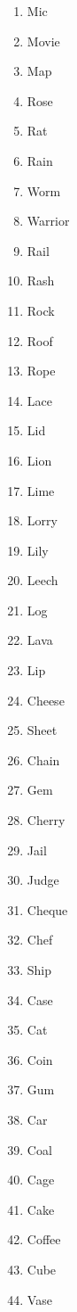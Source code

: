 \begin{enumerate}
       \item  Mic
       \item  Movie
       \item  Map
       \item  Rose
       \item  Rat
       \item  Rain
       \item  Worm
       \item  Warrior
       \item  Rail
       \item  Rash
       \item  Rock
       \item  Roof
       \item  Rope
       \item  Lace
       \item  Lid
       \item  Lion
       \item  Lime
       \item  Lorry
       \item  Lily
       \item  Leech
       \item  Log
       \item  Lava
       \item  Lip
       \item  Cheese
       \item  Sheet
       \item  Chain
       \item  Gem
       \item  Cherry
       \item  Jail
       \item  Judge
       \item  Cheque
       \item  Chef
       \item  Ship
       \item  Case
       \item  Cat
       \item  Coin
       \item  Gum
       \item  Car
       \item  Coal
       \item  Cage
       \item  Cake
       \item  Coffee
       \item  Cube
       \item  Vase

\end{enumerate}
